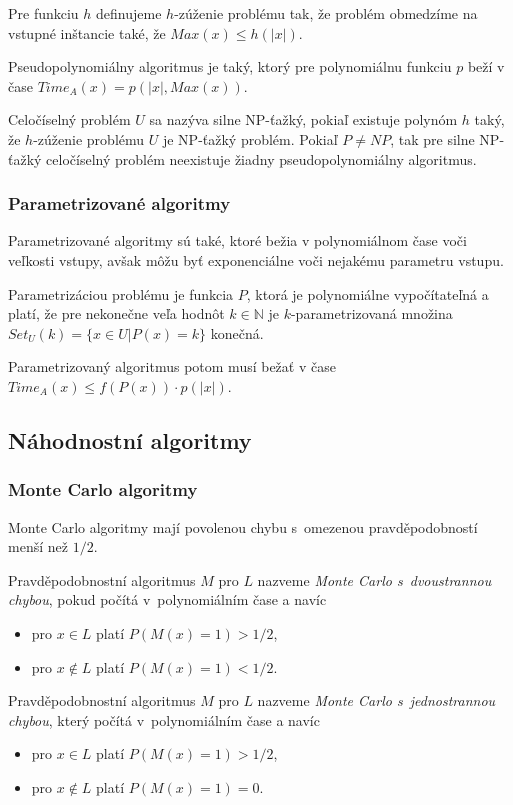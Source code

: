 Pre funkciu $h$ definujeme $h$-zúženie problému tak, že problém obmedzíme
na vstupné inštancie také, že $Max(x) \leq h(|x|)$.

Pseudopolynomiálny algoritmus je taký, ktorý pre polynomiálnu funkciu $p$ 
beží v čase $Time_A(x) = p(|x|, Max(x))$.

Celočíselný problém $U$ sa nazýva silne NP-ťažký, pokiaľ existuje polynóm $h$
taký, že $h$-zúženie problému $U$ je NP-ťažký problém. Pokiaľ $P \neq NP$, tak 
pre silne NP-ťažký celočíselný problém neexistuje žiadny pseudopolynomiálny algoritmus.

\subsubsection{Parametrizované algoritmy}
Parametrizované algoritmy sú také, ktoré bežia v polynomiálnom čase
voči veľkosti vstupy, avšak môžu byť exponenciálne voči nejakému parametru vstupu.

Parametrizáciou problému je funkcia $P$, ktorá je polynomiálne vypočítateľná
a platí, že pre nekonečne veľa hodnôt $k \in \mathbb{N}$ je $k$-parametrizovaná
množina $Set_U(k)=\{ x \in U | P(x) = k \}$ konečná.

Parametrizovaný algoritmus potom musí bežať v čase 
$Time_A(x) \leq f(P(x))\cdot p(|x|)$.

\subsection{Náhodnostní algoritmy}

\subsubsection{Monte Carlo algoritmy}

Monte Carlo algoritmy mají povolenou chybu s~omezenou pravděpodobností
menší než $1/2$.

\begin{definition}
Pravděpodobnostní algoritmus $M$ pro $L$ nazveme {\em Monte Carlo s~dvoustrannou
chybou}, pokud počítá v~polynomiálním čase
a navíc
\begin{itemize}
    \item pro $x \in L$ platí $P(M(x) = 1) > 1/2$,
    \item pro $x \not \in L$ platí $P(M(x) = 1) < 1/2$.
\end{itemize}
\end{definition}

\begin{definition}
Pravděpodobnostní algoritmus $M$ pro $L$ nazveme {\em Monte Carlo s~jednostrannou
chybou}, který počítá v~polynomiálním čase
a navíc
\begin{itemize}
    \item pro $x \in L$ platí $P(M(x) = 1) > 1/2$,
    \item pro $x \not \in L$ platí $P(M(x) = 1) = 0$.
\end{itemize}
\end{definition}

